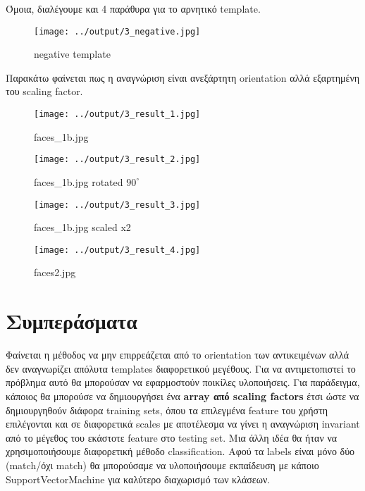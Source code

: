 \documentclass[11pt]{scrartcl} %
\begin{document}
Όμοια, διαλέγουμε και 4 παράθυρα για το αρνητικό template.

\begin{figure}[H]
  \texttt{[image: ../output/3\_negative.jpg]}
  \caption{negative template}
\end{figure}

Παρακάτω φαίνεται πως η αναγνώριση είναι ανεξάρτητη orientation αλλά εξαρτημένη του scaling factor.

\begin{figure}[H]
  \texttt{[image: ../output/3\_result\_1.jpg]}
  \caption{faces\_1b.jpg}
\end{figure}

\begin{figure}[H]
  \texttt{[image: ../output/3\_result\_2.jpg]}
  \caption{faces\_1b.jpg rotated $90^{\circ}$}
\end{figure}

\begin{figure}[H]
  \texttt{[image: ../output/3\_result\_3.jpg]}
  \caption{faces\_1b.jpg scaled x2}
\end{figure}

\begin{figure}[H]
  \texttt{[image: ../output/3\_result\_4.jpg]}
  \caption{faces2.jpg}
\end{figure}

\section{Συμπεράσματα}

Φαίνεται η μέθοδος να μην επιρρεάζεται από το orientation των αντικειμένων αλλά
δεν αναγνωρίζει απόλυτα templates διαφορετικού μεγέθους. Για να αντιμετοπιστεί
το πρόβλημα αυτό θα μπορούσαν να εφαρμοστούν ποικίλες υλοποιήσεις. Για παράδειγμα,
κάποιος θα μπορούσε να δημιουργήσει ένα \textbf{array από scaling factors} έτσι
ώστε να δημιουργηθούν διάφορα training sets, όπου τα επιλεγμένα feature του χρήστη
επιλέγονται και σε διαφορετικά scales με αποτέλεσμα να γίνει η αναγνώριση invariant
από το μέγεθος του εκάστοτε feature στο testing set. Μια άλλη ιδέα θα ήταν να χρησιμοποιήσουμε
διαφορετική μέθοδο classification. Αφού τα labels είναι μόνο δύο (match/όχι match)
θα μπορούσαμε να υλοποιήσουμε εκπαίδευση με κάποιο SupportVectorMachine για καλύτερο
διαχωρισμό των κλάσεων.
\end{document}
